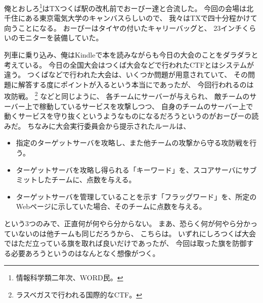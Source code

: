 俺とおしろ\footnote{情報科学類二年次、WORD民。}はTXつくば駅の改札前でおーぴー達と合流した。
今回の会場は北千住にある東京電気大学のキャンバスらしいので、
我々はTXで四十分程かけて向うことになる。
おーぴーはタイヤの付いたキャリーバッグと、
23インチくらいのモニターを装備していた。

列車に乗り込み、俺はKindleで本を読みながらも今日の大会のことをダラダラと考えている。
今日の全国大会はつくば大会などで行われたCTFとはシステムが違う。
つくばなどで行われた大会は、いくつか問題が用意されていて、
その問題に解答する度にポイントが入るという本当にであったが、
今回行われるのは攻防戦。
\DEFCON\footnote{ラスベガスで行われる国際的なCTF。}%
などと同じように、
各チームにサーバーが与えられ、
敵チームのサーバー上で稼動しているサービスを攻撃しつつ、
自身のチームのサーバー上で動くサービスを守り抜くというようなものになるだろうというのがおーぴーの読みだ。
ちなみに大会実行委員会から提示されたルールは、

\begin{itemize}
	\item 指定のターゲットサーバを攻略し、また他チームの攻撃から守る攻防戦を行う。
	\item ターゲットサーバを攻略し得られる「キーワード」を、スコアサーバにサブミットしたチームに、点数を与える。
	\item ターゲットサーバを管理していることを示す「フラッグワード」を、所定のWebページに示していた場合、そのチームに点数を与える。
\end{itemize}

という3つのみで、正直何が何やら分からない。
まあ、恐らく何が何やら分かっていないのは他チームも同じだろうから、
こちらは。
いずれにしろつくば大会ではただ立っている旗を取れば良いだけであったが、
今回は取った旗を防御する必要あろうというのはなんとなく想像がつく。

